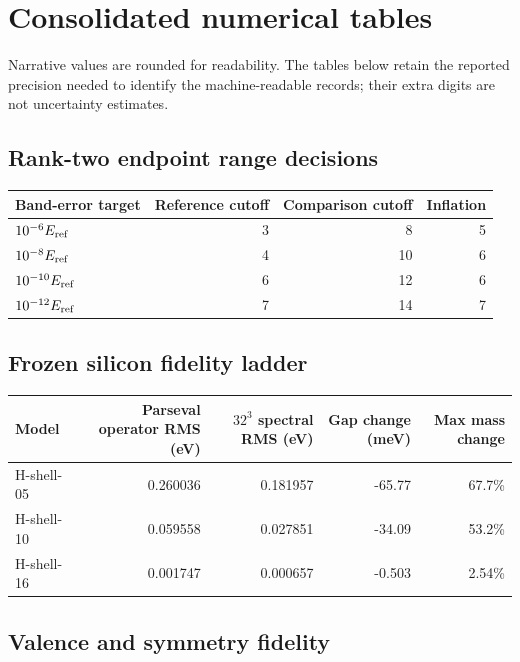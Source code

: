 \documentclass[11pt]{article}
\theoremstyle{definition}
\begin{document}
\section{Consolidated numerical tables}

Narrative values are rounded for readability.  The tables below retain the reported
precision needed to identify the machine-readable records; their extra digits are not
uncertainty estimates.

\small
\subsection{Rank-two endpoint range decisions}

\begin{center}
\begin{tabular}{@{}lrrr@{}}
\toprule
Band-error target & Reference cutoff & Comparison cutoff & Inflation\\
\midrule
$10^{-6}E_{\rm ref}$ & 3 & 8 & 5\\
$10^{-8}E_{\rm ref}$ & 4 & 10 & 6\\
$10^{-10}E_{\rm ref}$ & 6 & 12 & 6\\
$10^{-12}E_{\rm ref}$ & 7 & 14 & 7\\
\bottomrule
\end{tabular}
\end{center}

\subsection{Frozen silicon fidelity ladder}

\scriptsize
\begin{center}
\begin{tabular}{@{}lrrrr@{}}
\toprule
Model & Parseval operator RMS (eV) & $32^3$ spectral RMS (eV) & Gap change (meV) & Max mass change\\
\midrule
H-shell-05 & 0.260036 & 0.181957 & -65.77 & 67.7\%\\
H-shell-10 & 0.059558 & 0.027851 & -34.09 & 53.2\%\\
H-shell-16 & 0.001747 & 0.000657 & -0.503 & 2.54\%\\
\bottomrule
\end{tabular}
\end{center}
\small

\subsection{Valence and symmetry fidelity}
\end{document}
